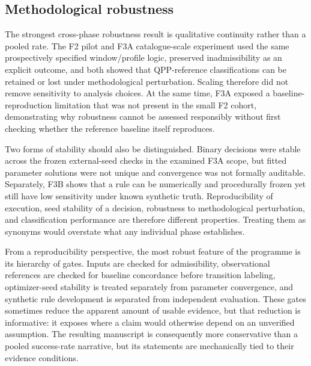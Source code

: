 \documentclass[11pt,a4paper]{article}
\begin{document}
\subsection{Methodological robustness}
The strongest cross-phase robustness result is qualitative continuity rather than a pooled rate. The F2 pilot and F3A catalogue-scale experiment used the same prospectively specified window/profile logic, preserved inadmissibility as an explicit outcome, and both showed that QPP-reference classifications can be retained or lost under methodological perturbation. Scaling therefore did not remove sensitivity to analysis choices. At the same time, F3A exposed a baseline-reproduction limitation that was not present in the small F2 cohort, demonstrating why robustness cannot be assessed responsibly without first checking whether the reference baseline itself reproduces.

Two forms of stability should also be distinguished. Binary decisions were stable across the frozen external-seed checks in the examined F3A scope, but fitted parameter solutions were not unique and convergence was not formally auditable. Separately, F3B shows that a rule can be numerically and procedurally frozen yet still have low sensitivity under known synthetic truth. Reproducibility of execution, seed stability of a decision, robustness to methodological perturbation, and classification performance are therefore different properties. Treating them as synonyms would overstate what any individual phase establishes.

From a reproducibility perspective, the most robust feature of the programme is its hierarchy of gates. Inputs are checked for admissibility, observational references are checked for baseline concordance before transition labeling, optimizer-seed stability is treated separately from parameter convergence, and synthetic rule development is separated from independent evaluation. These gates sometimes reduce the apparent amount of usable evidence, but that reduction is informative: it exposes where a claim would otherwise depend on an unverified assumption. The resulting manuscript is consequently more conservative than a pooled success-rate narrative, but its statements are mechanically tied to their evidence conditions.
\end{document}

